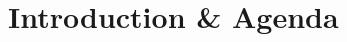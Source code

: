 \documentclass[sigconf]{acmart}
\begin{document}

				


%


\maketitle

\section*{Introduction \& Agenda}
\end{document}
